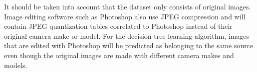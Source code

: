 It should be taken into account that the dataset only consists of original images. Image editing software such as Photoshop also use JPEG compression and will contain JPEG quantization tables correlated to Photoshop instead of their original camera make or model. For the decision tree learning algorithm, images that are edited with Photoshop will be predicted as belonging to the same source even though the original images are made with different camera makes and models. 

